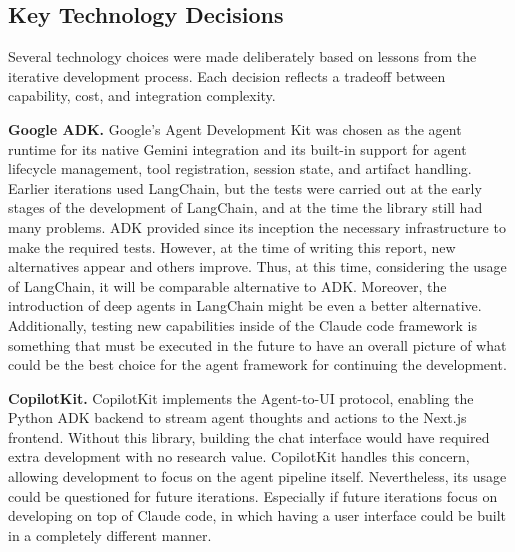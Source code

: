 \subsection{Key Technology Decisions}

Several technology choices were made deliberately based on lessons from the iterative
development process. Each decision reflects a tradeoff between capability, cost, and
integration complexity.

\textbf{Google ADK.}
Google's Agent Development Kit was chosen as the agent runtime for its native Gemini
integration and its built-in support for agent lifecycle management, tool registration,
session state, and artifact handling. Earlier iterations used LangChain, but the tests were 
carried out at the early stages of the development of LangChain, and at the time the library still had many problems.
ADK provided since its inception the necessary infrastructure to make the required tests. 
However, at the time of writing this report, new alternatives appear and others improve. 
Thus, at this time, considering the usage of LangChain, it will be comparable alternative to ADK. 
Moreover, the introduction of deep agents in LangChain might be even a better alternative. 
Additionally, testing new capabilities inside of the Claude code framework is something that 
must be executed in the future to have an overall picture of what could be the best choice for the agent framework for continuing the development.


\textbf{CopilotKit.}
CopilotKit implements the Agent-to-UI protocol, enabling the Python ADK backend to stream
agent thoughts and actions to the Next.js frontend. Without this library,
building the chat interface would have required extra development with no
research value. CopilotKit handles this concern, allowing development to focus
on the agent pipeline itself. Nevertheless, its usage could be questioned for future iterations. 
Especially if future iterations focus on developing on top of Claude code, in which having a user interface could be built in a completely different manner.

